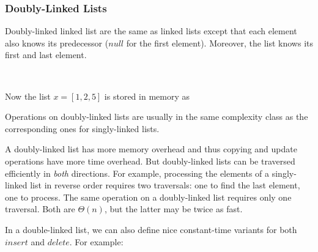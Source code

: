 \subsubsection{Doubly-Linked Lists}

Doubly-linked linked list are the same as linked lists except that each element also knows its predecessor ($null$ for the first element).
Moreover, the list knows its first and last element.

\begin{acode}
\\
\end{acode}

Now the list $x=[1,2,5]$ is stored in memory as
\begin{amemory}
\alocations
{}
\hline
{}
\hline
{}
\hline
{}
\end{amemory}

Operations on doubly-linked lists are usually in the same complexity class as the corresponding ones for singly-linked lists.

A doubly-linked list has more memory overhead and thus copying and update operations have more time overhead.
But doubly-linked lists can be traversed efficiently in \emph{both} directions.
For example, processing the elements of a singly-linked list in reverse order requires two traversals: one to find the last element, one to process.
The same operation on a doubly-linked list requires only one traversal.
Both are $\Theta(n)$, but the latter may be twice as fast.

In a double-linked list, we can also define nice constant-time variants for both $insert$ and $delete$.
For example:
\begin{acode}
\end{acode}

